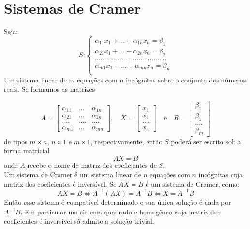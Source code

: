 \section*{Sistemas de Cramer}
Seja:\\
\begin{equation*}
S:\begin{cases}
\alpha_{11}x_{1}+...+\alpha_{1n}x_{n}=\beta_{1}\\
\alpha_{21}x_{1}+...+\alpha_{2n}x_{n}=\beta_{2}\\
......................................\\
\alpha_{m1}x_{1}+...+\alpha_{mn}x_{n}=\beta_{n}\\
\end{cases}
\end{equation*} 
Um sistema linear de $m$ equações com $n$ incógnitas sobre o conjunto dos números reais. Se formamos as matrizes

\begin{equation*}
A=\begin{bmatrix}
\alpha_{11}& ... &\alpha_{1n}\\
\alpha_{21}& ... &\alpha_{2n}\\
....&....&....\\
\alpha_{m1}& ... &\alpha_{mn}
\end{bmatrix}, \quad X=\begin{bmatrix}
x_{1}\\
x_{1}\\
....\\
x_{n} 
\end{bmatrix}\quad \text{e} \quad B=\begin{bmatrix}
\beta_{1}\\
\beta_{1}\\
....\\
\beta_{m} 
\end{bmatrix}
\end{equation*}
de tipos $m\times n$, $n\times 1$ e $m\times 1$, respectivamente, então $S$ poderá ser escrito sob a forma matricial\\
\begin{equation*}
AX=B
\end{equation*}
onde $A$ recebe o nome de matriz dos coeficientes de $S$.\\

Um sistema de Cramer é um sistema linear de $n$ equações com $n$ incógnitas cuja matriz dos coeficientes é inversível. Se $AX=B$ é um sistema de Cramer, como:\\
\begin{equation*}
AX=B \Leftrightarrow A^{-1}(AX)=A^{-1}B \Leftrightarrow X=A^{-1}B
\end{equation*}
Então esse sistema é compatível determinado e sua única solução é dada por $A^{-1}B$. Em particular um sistema quadrado e homogêneo cuja matriz dos coeficientes é inversível só admite a solução trivial.

